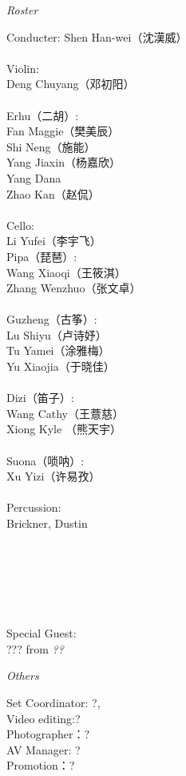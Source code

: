 \documentclass[letter,6pt,poets]{ConcProg}
\begin{document}
\begin{spacing}{1.0}
\begin{center}
\Large\textsl{ Roster}
\end{center}
\begin{multicols}{2}%
Conducter: Shen  Han-wei（沈漢威）
\\
\\
Violin:\\
Deng  Chuyang（邓初阳）\\
\\
Erhu（二胡）:     \\     
Fan  Maggie（樊美辰）\\
Shi Neng（施能）\\
Yang  Jiaxin（杨嘉欣）\\
Yang  Dana\\
Zhao  Kan（赵侃）\\
\\
Cello:\\
Li  Yufei（李宇飞）\\

Pipa（琵琶）:\\
Wang Xiaoqi（王筱淇）\\
Zhang  Wenzhuo（张文卓）\\
\\
Guzheng（{古筝}）:\\
Lu  Shiyu（卢诗妤）\\
Tu  Yamei（涂雅梅）\\
Yu Xiaojia（于晓佳）
\\
\\
Dizi（笛子）: 				 \\
Wang  Cathy（王薏慈）\\
Xiong  Kyle （熊天宇）\\
\\
Suona（唢呐）:\\
Xu  Yizi（许易孜）
\\
\\
Percussion:\\
Brickner, Dustin
\\
\\
\\
\\
\\
\\
\\
Special Guest:\\
??? 
 \footnotesize{ from } \emph{ ??}
\\
\end{multicols}
\begin{center}
\Large\textsl{ Others}
\end{center}
\begin{multicols}{2}%
 Set Coordinator: ?,\\ 
 Video editing:? \\
Photographer：?\\
AV Manager: ?\\
Promotion：?\\
\\



\end{multicols}
\end{spacing}
\end{document}

